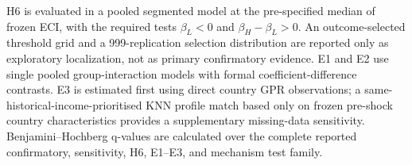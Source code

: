 H6 is evaluated in a pooled segmented model at the pre-specified median of frozen ECI, with the required tests \(\beta_L<0\) and \(\beta_H-\beta_L>0\). An outcome-selected threshold grid and a 999-replication selection distribution are reported only as exploratory localization, not as primary confirmatory evidence. E1 and E2 use single pooled group-interaction models with formal coefficient-difference contrasts. E3 is estimated first using direct country GPR observations; a same-historical-income-prioritised KNN profile match based only on frozen pre-shock country characteristics provides a supplementary missing-data sensitivity. Benjamini--Hochberg q-values are calculated over the complete reported confirmatory, sensitivity, H6, E1--E3, and mechanism test family.
